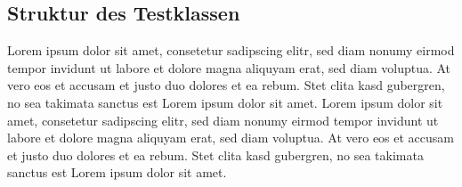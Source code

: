 \documentclass[12pt,oneside,a4paper,bibtotoc,liststotoc,pointlessnumbers]{scrartcl}
\begin{document}
\subsection{Struktur des Testklassen}
Lorem ipsum dolor sit amet, consetetur sadipscing elitr, sed diam nonumy eirmod tempor invidunt ut labore et dolore magna aliquyam erat, sed diam voluptua. At vero eos et accusam et justo duo dolores et ea rebum. Stet clita kasd gubergren, no sea takimata sanctus est Lorem ipsum dolor sit amet. Lorem ipsum dolor sit amet, consetetur sadipscing elitr, sed diam nonumy eirmod tempor invidunt ut labore et dolore magna aliquyam erat, sed diam voluptua. At vero eos et accusam et justo duo dolores et ea rebum. Stet clita kasd gubergren, no sea takimata sanctus est Lorem ipsum dolor sit amet.

\newpage

\listoffigures

\newpage

\listoftables



\newpage
\end{document}
